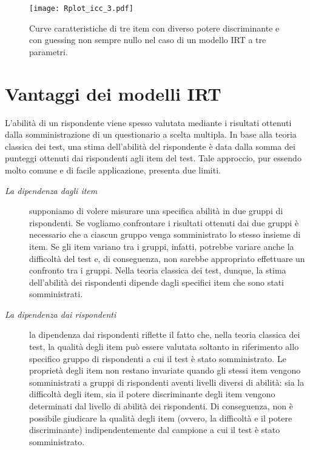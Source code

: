 \begin{figure}[h!]
\begin{center}
\texttt{[image: Rplot\_icc\_3.pdf]}
\caption{Curve caratteristiche di tre item con diverso potere discriminante e con guessing non sempre nullo nel caso di un modello IRT a tre parametri.}
\label{fig:icc3}
\end{center}
\end{figure}



\section{Vantaggi dei modelli IRT}

L'abilità di un rispondente viene spesso valutata mediante i risultati ottenuti dalla somministrazione di un questionario a scelta multipla. 
In base alla teoria classica dei test, una stima dell'abilità del rispondente è data dalla somma dei punteggi ottenuti dai rispondenti agli item del test.  
Tale approccio, pur essendo molto comune e di facile applicazione, presenta due  limiti.  

\begin{description}
\item[\emph{La dipendenza dagli item}] supponiamo di volere misurare una specifica abilità in due  gruppi di rispondenti. 
Se vogliamo confrontare  i risultati ottenuti dai due gruppi è necessario che a ciascun gruppo venga somministrato lo stesso insieme di item.  
Se gli item variano tra i gruppi, infatti, potrebbe variare anche la difficoltà del test e, di conseguenza, non sarebbe appropriato effettuare un confronto tra i gruppi. 
Nella teoria classica dei test, dunque, la stima dell'abilità dei rispondenti dipende dagli specifici item che sono stati somministrati. 
\item[\emph{La dipendenza dai rispondenti}] la dipendenza dai rispondenti riflette il fatto che, nella teoria classica dei test, la qualità degli item può essere valutata soltanto in riferimento allo specifico gruppo di rispondenti a cui il test è stato somministrato. 
Le proprietà degli item non restano invariate quando gli stessi item vengono somministrati a gruppi di rispondenti aventi livelli diversi di abilità: sia la difficoltà degli item, sia il potere discriminante degli item vengono determinati dal livello di abilità dei rispondenti. 
Di conseguenza, non è possibile giudicare la qualità degli item (ovvero, la difficoltà e il potere discriminante) indipendentemente dal campione a cui il test è stato somministrato.
\end{description}

